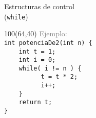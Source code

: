 \documentclass[aspectratio=169]{beamer}
\begin{document}
\begin{frame}[fragile,t]{Estructuras de control\\ (\texttt{while})}
    \begin{textblock}{100}(64,40)
    \textcolor{gray}{Ejemplo:}\\
    \normalsize \verb|int potenciaDe2(int n) {|\\
    \normalsize \verb|    int t = 1;|\\
    \normalsize \verb|    int i = 0;|\\
    \normalsize \verb|    while( i != n ) {|\\
    \normalsize \verb|          t = t * 2;|\\
    \normalsize \verb|          i++;|\\
    \normalsize \verb|    }|\\
    \normalsize \verb|    return t;|\\
    \normalsize \verb|}|\\
    \end{textblock}
\end{frame}
\end{document}
